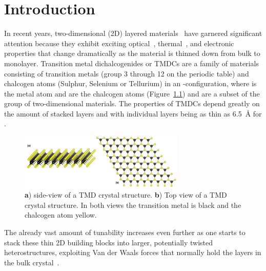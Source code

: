\chapter{Introduction}
%
In recent years, two-dimensional (2D) layered materials~\cite{2dmat, LI2016322, https://doi.org/10.1002/smll.202107059} have garnered significant attention because they exhibit exciting optical~\cite{optic1, yuHighlyEfficientGatetunable2013, dengBlackPhosphorusMonolayer2014, chengElectroluminescencePhotocurrentGeneration2014}, thermal~\cite{popThermalPropertiesGraphene2012, chenThermoelectricTransportGraphene2015}, and electronic~\cite{britnellFieldEffectTunnelingTransistor2012, georgiouVerticalFieldeffectTransistor2013, yuVerticallyStackedMultiheterostructures2013,moriyaLargeCurrentModulation2014, sarkarSubthermionicTunnelFieldeffect2015} properties that change dramatically as the material is thinned down from bulk to monolayer.
%
Transition metal dichalcogenides or TMDCs are a family of materials consisting of transition metals (group 3 through 12 on the periodic table) and chalcogen atoms (Sulphur, Selenium or Tellurium) in an -configuration, where  is the metal atom and  are the chalcogen atoms (Figure~\ref{fig:tmdc_struc}) and are a subset of the group of two-dimensional materials\cite{C7TA04268J}. The properties of TMDCs depend greatly on the amount of stacked layers and with individual layers being as thin as \SI{6.5}{\angstrom} for .
%
\begin{figure}
    \centering
    \includegraphics[width=0.7\textwidth, keepaspectratio]{resources/Figures/Monolayer_TMDC_structure.jpg}
        \caption{\textbf{a}) side-view of a TMD crystal structure. \textbf{b}) Top view of a TMD crystal structure. In both views the transition metal is black and the chalcogen atom yellow.}
    \label{fig:tmdc_struc}
\end{figure}
%
The already vast amount of tunability increases even further as one starts to stack these thin 2D building blocks into larger, potentially twisted heterostructures, exploiting Van der Waals forces that normally hold the layers in the bulk crystal~\cite{ScopusDocumentDetails, buscemaPhotocurrentGenerationTwodimensional2015, geimVanWaalsHeterostructures2013}.\\

